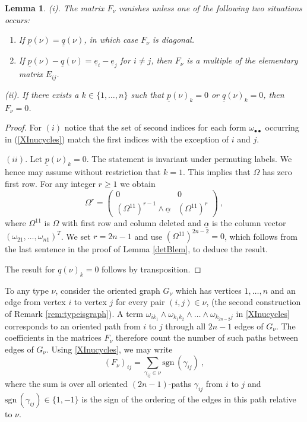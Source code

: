 \documentclass[10pt]{amsart}
\newcommand{\pp}{{\underline{p}}}
\newcommand{\qq}{{\underline{q}}}
\newcommand{\eee}{{\underline{e}}}
\newcommand{\sgn}{\mathrm{sgn}\,}
\theoremstyle{plain}
\newtheorem{lem}[thm]{Lemma}
\newcommand{\0}{\color{blue}{\mathsf{0}}}
\begin{document}
\begin{lem} \label{lem: shapeFnu} (i). The matrix $F_{\nu}$ vanishes unless one of the following  two situations occurs:
\begin{enumerate}
\item   If $\pp(\nu)=\qq(\nu)$, in which case  $F_\nu$ is diagonal.
\item   If $\pp(\nu)-\qq(\nu)=\eee_i-\eee_j$ for $i\neq j$, then
$F_\nu$ is a multiple of the elementary matrix $E_{ij}$. 
\end{enumerate}
(ii). If there exists a $k\in\{1,\ldots,n\}$ such that $\pp(\nu)_k=0$ or $\qq(\nu)_k=0$, then $F_\nu=0$.
\end{lem}
\begin{proof}
For $(i)$ notice that the  set of second indices for each form $\omega_{\bullet \bullet}$ occurring  in (\ref{XInucycles}) match the first indices
with the exception of $i$ and $j$.

$(ii).$ Let $\pp(\nu)_k=0$. The statement is invariant under permuting labels. We hence
may assume without restriction that $k=1$. This implies that $\Omega$
has zero first row. For any integer $r\geq1$
we obtain
$$
\Omega^r=\left(\begin{array}{cc}0&0\\
(\Omega^{11})^{r-1}\wedge\underline{\alpha}&(\Omega^{11})^r\end{array}\right)\ ,
$$
where $\Omega^{11}$ is $\Omega$ with first row and column deleted and $\underline{\alpha}$ is the column vector $(\omega_{21},\ldots, \omega_{n1})^T$. 
We set $r=2n-1$ and use $(\Omega^{11})^{2n-2}=0$, which follows from
the last sentence in the proof of Lemma \ref{detBlem}, to deduce the result.

The result for $\qq(\nu)_k=0$ follows by transposition.
\end{proof}

To any type $\nu$,  consider the oriented graph $G_\nu$ which
has vertices $1,\ldots,n$ and an   edge from vertex $i$ to vertex $j$ for every pair $(i,j) \in\nu$, (the second construction  of Remark \ref{rem:typeisgraph}).
A term $\omega_{ik_1}\wedge\omega_{k_1k_2}\wedge\ldots\wedge\omega_{k_{2n-2}j}$ in  \eqref{XInucycles}
corresponds to an oriented path from
$i$ to $j$ through all $2n-1$ edges of $G_\nu$. The coefficients in the matrices $F_{\nu}$ therefore count the number of such paths between edges of $G_{\nu}$. 
Using \eqref{XInucycles}, we may write 
\begin{equation}\label{sumpath}
(F_\nu)_{ij}=\sum_{\gamma_{ij}\in\nu}\sgn(\gamma_{ij})\ ,
\end{equation}
where the sum is over all oriented $(2n-1)$-paths $\gamma_{ij}$ from $i$ to $j$ and $\sgn(\gamma_{ij}) \in \{1,-1\} $ is the sign of the ordering of the edges in this path relative to $\nu$.
\end{document}
